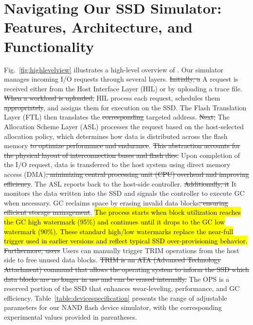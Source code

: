 \documentclass{ieeeaccess}
\begin{document}
\section{Navigating Our SSD Simulator: Features, Architecture, and Functionality}
\label{subsec:navigating_our_ssd_simulator}

Fig.~\ref{fig:highlevelview} illustrates a high-level overview of \eyanassdsim. Our simulator manages incoming I/O requests through several layers.
\sout{Initially, a} A request is received either from the Host Interface Layer (HIL) or by uploading a trace file. \sout{When a workload is uploaded,} HIL process each request, schedules them \sout{appropriately}, and assigns them for execution on the SSD. The Flash Translation Layer (FTL) then translates the \sout{corresponding} targeted address. \sout{Next,} The Allocation Scheme Layer (ASL) processes the request based on the host-selected allocation policy, which determines how data is distributed across the flash memory \sout{to optimize performance and endurance}. \sout{This abstraction accounts for the physical layout of interconnection buses and flash dies.} Upon completion of the I/O request, data is transferred to the host system using direct memory access (DMA)\sout{, minimizing central processing unit (CPU) overhead and improving efficiency}. The ASL reports back to the host-side controller. \sout{Additionally, it} It monitors the data written into the SSD and signals the controller to execute GC when necessary. GC reclaims space by erasing invalid data blocks\sout{, ensuring efficient storage management}. \hl{The process starts when block utilization reaches the GC high watermark (95\%) and continues until it drops to the GC low watermark (90\%). These standard high/low watermarks replace the near-full trigger used in earlier versions and reflect typical SSD over-provisioning behavior.} \sout{Furthermore, users} Users can manually trigger TRIM operations from the host side to free unused data blocks. \sout{TRIM is an ATA (Advanced Technology Attachment) command that allows the operating system to inform the SSD which data blocks are no longer in use and can be erased internally.} The OPS is a reserved portion of the SSD that enhances wear-leveling, performance, and GC efficiency. 
Table~\ref{table:devicespecification} presents the range of adjustable parameters for our NAND flash device simulator, with the corresponding experimental values provided in parentheses.
\end{document}
